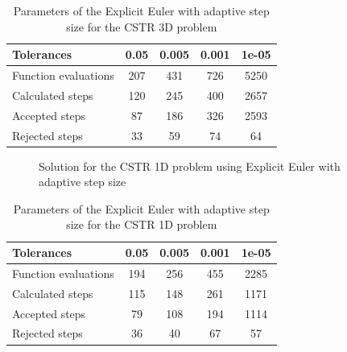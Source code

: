 \begin{table}[H]
    \centering
    \begin{tabular}{@{}l|cccc@{}}
    \toprule
    Tolerances           & 0.05 & 0.005 & 0.001 & 1e-05 \\ \midrule
    Function evaluations & 207  & 431   & 726   & 5250  \\
    Calculated steps     & 120  & 245   & 400   & 2657  \\
    Accepted steps       & 87   & 186   & 326   & 2593  \\
    Rejected steps       & 33   & 59    & 74    & 64    \\ \bottomrule
    \end{tabular}
    \caption{Parameters of the Explicit Euler with adaptive step size for the CSTR 3D problem}
    \label{2_5_3D_tols_table}
\end{table}

\begin{figure}[H]
    \centering
    \caption{Solution for the CSTR 1D problem using Explicit Euler with adaptive step size}
    \label{2_5_1D_tols}
\end{figure}

\begin{table}[H]
    \centering
    \begin{tabular}{@{}l|cccc@{}}
    \toprule
    Tolerances           & 0.05 & 0.005 & 0.001 & 1e-05 \\ \midrule
    Function evaluations & 194  & 256   & 455   & 2285  \\
    Calculated steps     & 115  & 148   & 261   & 1171  \\
    Accepted steps       & 79   & 108   & 194   & 1114  \\
    Rejected steps       & 36   & 40    & 67    & 57    \\ \bottomrule
    \end{tabular}
    \caption{Parameters of the Explicit Euler with adaptive step size for the CSTR 1D problem}
    \label{2_5_1D_tols_table}
\end{table}

